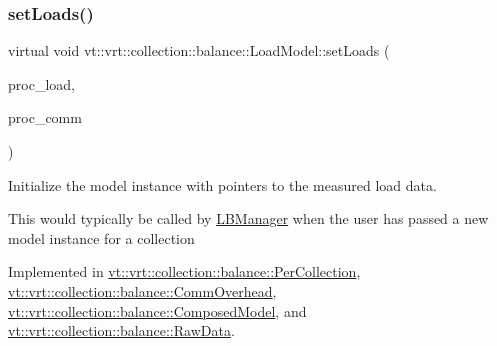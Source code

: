 \mbox{\label{structvt_1_1vrt_1_1collection_1_1balance_1_1_load_model_a07512b8d95025a21a7c25cc3fdb817ad}} 
\subsubsection{\texorpdfstring{set\+Loads()}{setLoads()}}
{\footnotesize\ttfamily virtual void vt\+::vrt\+::collection\+::balance\+::\+Load\+Model\+::set\+Loads (\begin{DoxyParamCaption}\item[{std\+::unordered\+\_\+map$<$ \hyperlink{namespacevt_a46ce6733d5cdbd735d561b7b4029f6d7}{Phase\+Type}, \hyperlink{namespacevt_1_1vrt_1_1collection_1_1balance_a5339303db2e1ce964d783a53fd74e6b1}{Load\+Map\+Type} $>$ const $\ast$}]{proc\+\_\+load,  }\item[{std\+::unordered\+\_\+map$<$ \hyperlink{namespacevt_a46ce6733d5cdbd735d561b7b4029f6d7}{Phase\+Type}, \hyperlink{namespacevt_1_1vrt_1_1collection_1_1balance_a10860c956804d644db54a16012352728}{Comm\+Map\+Type} $>$ const $\ast$}]{proc\+\_\+comm }\end{DoxyParamCaption})\hspace{0.3cm}{\ttfamily [pure virtual]}}



Initialize the model instance with pointers to the measured load data. 

This would typically be called by \hyperlink{structvt_1_1vrt_1_1collection_1_1balance_1_1_l_b_manager}{L\+B\+Manager} when the user has passed a new model instance for a collection 

Implemented in \hyperlink{structvt_1_1vrt_1_1collection_1_1balance_1_1_per_collection_aba8f472fbe40c44c9f0f9028afe29cfc}{vt\+::vrt\+::collection\+::balance\+::\+Per\+Collection}, \hyperlink{structvt_1_1vrt_1_1collection_1_1balance_1_1_comm_overhead_a5208f7952b3a327ca118e9be2f4c5a55}{vt\+::vrt\+::collection\+::balance\+::\+Comm\+Overhead}, \hyperlink{classvt_1_1vrt_1_1collection_1_1balance_1_1_composed_model_a3a7da5e81a933ea88f87a1226fd3b401}{vt\+::vrt\+::collection\+::balance\+::\+Composed\+Model}, and \hyperlink{structvt_1_1vrt_1_1collection_1_1balance_1_1_raw_data_aa29d4f35b5d3afb4690cef64fb65b887}{vt\+::vrt\+::collection\+::balance\+::\+Raw\+Data}.

